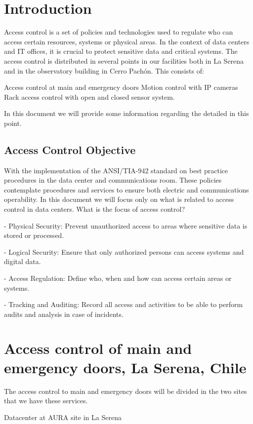 \section{Introduction}

Access control is a set of policies and technologies used to regulate who can access certain resources, systems or physical areas. In the context of data centers and IT offices, it is crucial to protect sensitive data and critical systems.
The access control is distributed in several points in our facilities both in La Serena and in the observatory building in Cerro Pachón.
This consists of:

Access control at main and emergency doors
Motion control with IP cameras
Rack access control with open and closed sensor system.

In this document we will provide some information regarding the detailed in this point.

\subsection{Access Control Objective}

With the implementation of the ANSI/TIA-942 standard on best practice procedures in the data center and communications room. These policies contemplate procedures and services to ensure both electric and communications operability. In this document we will focus only on what is related to access control in data centers.
What is the focus of access control?

- Physical Security: Prevent unauthorized access to areas where sensitive data is stored or processed.

- Logical Security: Ensure that only authorized persons can access systems and digital data.

- Access Regulation: Define who, when and how can access certain areas or systems.

- Tracking and Auditing: Record all access and activities to be able to perform audits and analysis in case of incidents.


\section{Access control of main and emergency doors, La Serena, Chile}

The access control to main and emergency doors will be divided in the two sites that we have these services.

Datacenter at AURA site in La Serena

